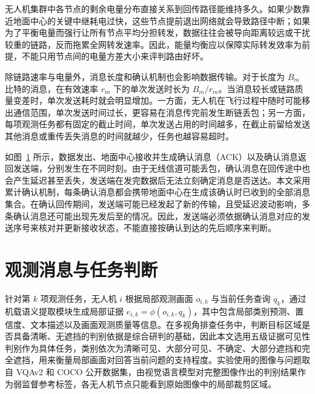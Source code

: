 无人机集群中各节点的剩余电量分布直接关系到回传路径能维持多久。如果少数靠近地面中心的关键中继耗电过快，这些节点提前退出网络就会导致路径中断；如果为了平衡电量而强行让所有节点平均分担转发，数据往往会被导向距离较远或干扰较重的链路，反而拖累全网转发速率。因此，能量均衡应以保障实际转发效率为前提，不能只用节点间的电量方差大小来评判路由好坏。

除链路速率与电量外，消息长度和确认机制也会影响数据传输。对于长度为 $B_m$ 比特的消息，在有效速率 $r_m$ 下的单次发送时长为 $B_m/r_m$。当消息较长或链路质量变差时，单次发送耗时就会明显增加。一方面，无人机在飞行过程中随时可能移出通信范围，单次发送时间过长，更容易在消息传完前发生断链丢包；另一方面，每项观测任务都有固定的截止时间，单次发送占用的时间越多，在截止前留给发送其他消息或重传丢失消息的时间就越少，任务也越容易超时。

\begin{figure}[htbp]
\centering

\label{fig:base:timeline}
\end{figure}

如图~\ref{fig:base:timeline} 所示，数据发出、地面中心接收并生成确认消息（ACK）以及确认消息返回发送端，分别发生在不同时刻。由于无线信道可能丢包，确认消息在回传途中也会产生延迟甚至丢失，发送端在发完数据后无法立刻确定消息是否送达。本文采用累计确认机制，每条确认消息都会携带地面中心在生成该确认时已收到的全部消息集合。在确认回传期间，发送端可能已经发起了新的传输，且受延迟波动影响，多条确认消息还可能出现先发后至的情况。因此，发送端必须依据确认消息对应的发送序号来核对并更新接收状态，不能直接按确认到达的先后顺序来判断。

\section{观测消息与任务判断}

针对第 $k$ 项观测任务，无人机 $i$ 根据局部观测画面 $o_{i,k}$ 与当前任务查询 $q_k$，通过机载语义提取模块生成局部证据 $e_{i,k}=\phi(o_{i,k},q_k)$，其中包含局部类别预测、置信度、文本描述以及画面观测质量等信息。在多视角排查任务中，判断目标区域是否具备清晰、无遮挡的判别依据是综合研判的基础，因此本文选用五级证据可见性判别作为具体任务，类别依次为清晰可见、大部分可见、不确定、大部分遮挡和完全遮挡，用来衡量局部画面对回答当前问题的支持程度。实验使用的图像与问题取自 VQAv2 和 COCO 公开数据集，由视觉语言模型对完整图像作出的判别结果作为弱监督参考标签，各无人机节点只能看到原始图像中的局部裁剪区域。

